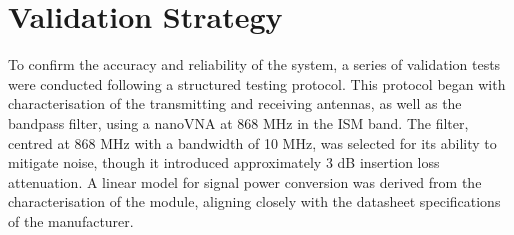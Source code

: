 \section{Validation Strategy}
\label{sec:validation_strategy}

To confirm the accuracy and reliability of the system, a series of validation tests were conducted following a structured testing protocol. This protocol began with characterisation of the transmitting and receiving antennas, as well as the bandpass filter, using a nanoVNA at 868 MHz in the ISM band. The filter, centred at 868 MHz with a bandwidth of 10 MHz, was selected for its ability to mitigate noise, though it introduced approximately 3 dB insertion loss attenuation. A linear model for signal power conversion was derived from the characterisation of the module, aligning closely with the datasheet specifications of the manufacturer.

